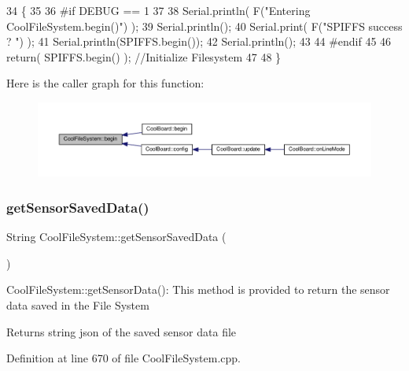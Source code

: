 \begin{DoxyCode}
34 \{
35 
36 \textcolor{preprocessor}{#if DEBUG == 1}
37 
38     Serial.println( F(\textcolor{stringliteral}{"Entering CoolFileSystem.begin()"}) );
39     Serial.println();   
40     Serial.print( F(\textcolor{stringliteral}{"SPIFFS success ? "}) );
41     Serial.println(SPIFFS.begin());
42     Serial.println();
43 
44 \textcolor{preprocessor}{#endif}
45 
46     \textcolor{keywordflow}{return}( SPIFFS.begin() );                                   \textcolor{comment}{//Initialize Filesystem}
47 
48 \}
\end{DoxyCode}
Here is the caller graph for this function\+:\nopagebreak
\begin{figure}[H]
\begin{center}
\leavevmode
\includegraphics[width=350pt]{classCoolFileSystem_a6ba6f666ed4c530174f8569d2c636748_icgraph}
\end{center}
\end{figure}
\mbox{\label{classCoolFileSystem_a5c58bca3735c0ed3efb268d70ef998ef}} 
\subsubsection{\texorpdfstring{get\+Sensor\+Saved\+Data()}{getSensorSavedData()}}
{\footnotesize\ttfamily String Cool\+File\+System\+::get\+Sensor\+Saved\+Data (\begin{DoxyParamCaption}{ }\end{DoxyParamCaption})}

Cool\+File\+System\+::get\+Sensor\+Data()\+: This method is provided to return the sensor data saved in the File System

\begin{DoxyReturn}{Returns}
string json of the saved sensor data file 
\end{DoxyReturn}


Definition at line 670 of file Cool\+File\+System.\+cpp.



